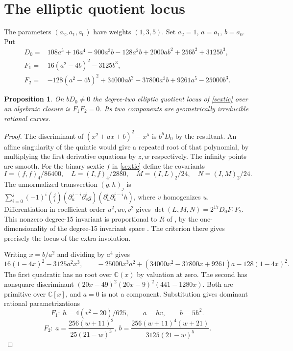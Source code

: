 \documentclass[11pt]{article}
\newtheorem{proposition}[theorem]{Proposition}
\begin{document}
\section{The elliptic quotient locus}
The parameters $(a_2,a_1,a_0)$ have weights $(1,3,5)$. Set $a_2=1$,
$a=a_1$, $b=a_0$. Put
\begin{align*}
 D_0={}&108a^5+16a^4-900a^3b-128a^2b+2000ab^2+256b^2+3125b^3,\\
 F_1={}&16(a^2-4b)^2-3125b^3,\\
 F_2={}&-128(a^2-4b)^2+34000ab^2-37800a^3b+9261a^5-25000b^3 .
\end{align*}
\begin{proposition}\label{locus}
On $bD_0\ne0$ the degree-two elliptic quotient locus of \eqref{sextic}
over an algebraic closure is $F_1F_2=0$. Its two components are
geometrically irreducible rational curves.
\end{proposition}
\begin{proof}
The discriminant of $(x^2+ax+b)^2-x^5$ is $b^5D_0$ by the resultant.
An affine singularity of the quintic would give a repeated root of
that polynomial, by multiplying the first derivative equations by
$z,w$ respectively. The infinity points are smooth. For the binary
sextic $f$ in \eqref{sextic} define the covariants
\[
 I=(f,f)_4/86400,\quad L=(I,f)_4/2880,\quad
 M=(I,L)_2/24,\quad N=(I,M)_2/24.
\]
The unnormalized transvection $(g,h)_j$ is
$\sum_{i=0}^j(-1)^i\binom ji
(\partial_u^{j-i}\partial_v^i g)(\partial_u^i\partial_v^{j-i}h)$,
where $v$ homogenizes $u$. Differentiation in coefficient order
$u^2,uv,v^2$ gives $\det(L,M,N)=2^{17}D_0F_1F_2$.
This nonzero degree-15 invariant is proportional to $R$ of
\cite[Lemma 2.5]{MS}, by the one-dimensionality of the degree-15
invariant space \cite{CFG}. The criterion there gives precisely the locus
of the extra involution.

Writing $x=b/a^2$ and dividing by $a^4$ gives
\[
 16(1-4x)^2-3125a^2x^3,\qquad
 -25000x^3a^2+(34000x^2-37800x+9261)a-128(1-4x)^2 .
\]
The first quadratic has no root over $\mathbb C(x)$ by valuation at zero.
The second has nonsquare discriminant
$(20x-49)^2(20x-9)^2(441-1280x)$. Both are primitive over
$\mathbb C[x]$, and $a=0$ is not a component. Substitution gives dominant
rational parametrizations
\[
 F_1:\ h=4(v^2-20)/625,\qquad a=hv,\qquad b=5h^2.
\]
\[
 F_2:\ a=\frac{256(w+11)^2}{25(21-w)^3},\
 b=\frac{256(w+11)^4(w+21)}{3125(21-w)^5}.
\]
\end{proof}
\end{document}
